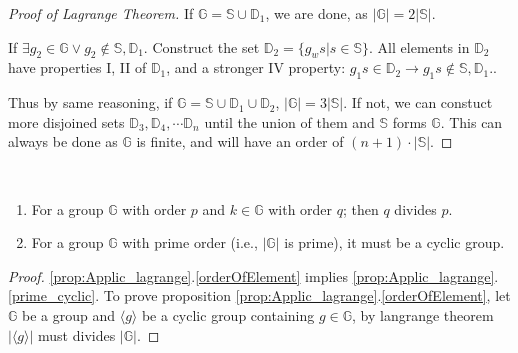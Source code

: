 \documentclass[../note.tex]{subfiles}
\begin{document}
\begin{proof}[Proof of Lagrange Theorem]
	If $\mathbb{G}=\mathbb{S}\cup \mathbb{D}_1$, we are done, as $|\mathbb{G}| = 2|\mathbb{S}|$. 

	If $\exists g_2 \in \mathbb{G} \lor g_2 \notin \mathbb{S}, \mathbb{D}_1$. 
	Construct the set $\mathbb{D}_2=\{g_ws|s \in \mathbb{S}\}$. All elements in $\mathbb{D}_2$ have properties I, II of $\mathbb{D}_1$, and a stronger IV property: 
	$g_1s \in \mathbb{D}_2 \rightarrow g_1s \notin \mathbb{S}, \mathbb{D}_1.$.

	Thus by same reasoning, if $\mathbb{G}=\mathbb{S}\cup \mathbb{D}_1 \cup \mathbb{D}_2$, $|\mathbb{G}| = 3|\mathbb{S}|$.
	If not, we can constuct more disjoined sets $\mathbb{D}_3, \mathbb{D}_4, \cdots \mathbb{D}_n$ until the union of them and $\mathbb{S}$ forms $\mathbb{G}$. This can always be done as $\mathbb{G}$ is finite, and will have an order of $(n+1)\cdot |\mathbb{S}|. $
\end{proof}

\begin{proposition}\label{prop:Applic_lagrange}
	\ 
\begin{enumerate}
	\item \label{orderOfElement}For a group $\mathbb{G}$ with order $p$ and $k \in \mathbb{G}$ with order $q$; then $q$ divides $p$.
	\item \label{prime_cyclic} For a group $\mathbb{G}$ with prime order (i.e., $|\mathbb{G}|$ is prime), it must be a cyclic group.
\end{enumerate}
\end{proposition}

\begin{proof}
	\ref{prop:Applic_lagrange}.\ref{orderOfElement} implies \ref{prop:Applic_lagrange}.\ref{prime_cyclic}.
	To prove proposition \ref{prop:Applic_lagrange}.\ref{orderOfElement}, let $\mathbb{G}$ be a group and $\langle g\rangle$ be a cyclic group containing $g \in \mathbb{G}$, by langrange theorem $|\langle g\rangle|$ must divides $|\mathbb{G}|$.
\end{proof}
\end{document}
